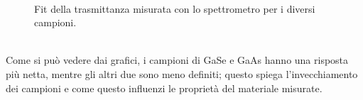 \documentclass[11pt]{article} %
\begin{document}
\begin{figure}[!h]
\centering
    \\ %
\caption{Fit della trasmittanza misurata con lo spettrometro per i diversi campioni.}
\end{figure}
\\Come si può vedere dai grafici, i campioni di GaSe e GaAs hanno una risposta più netta, mentre gli altri due sono meno definiti; questo spiega l'invecchiamento dei campioni e come questo influenzi le proprietà del materiale misurate.
\end{document}
